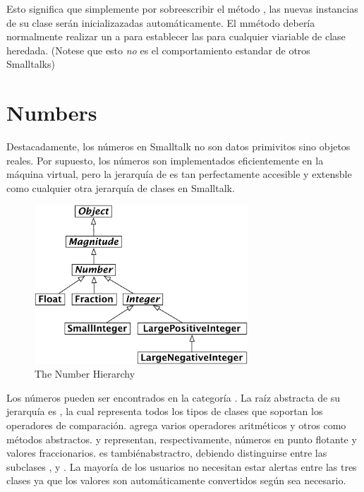 \documentclass[a4paper,10pt,twoside]{book}
\begin{document}
Esto significa que simplemente por sobreescribir el m\'etodo , las nuevas instancias de su clase ser\'an inicializazadas autom\'aticamente. El mm\'etodo  deber\'ia normalmente realizar un  a  para establecer las  para cualquier viariable de clase heredada.
(Notese que esto \emph{no} es el comportamiento estandar de otros Smalltalks)


\section{Numbers}

Destacadamente, los n\'umeros en Smalltalk no son datos primivitos sino objetos reales. Por supuesto, los n\'umeros son implementados eficientemente en la m\'aquina virtual, pero la jerarqu\'ia de  es tan perfectamente accesible y extensble como cualquier otra jerarqu\'ia de clases en Smalltalk.

\begin{figure}[ht]
\centerline {\includegraphics[width=8cm]{NumberHierarchy}}
\caption{The Number Hierarchy }
\end{figure}


Los n\'umeros pueden ser encontrados en la categor\'ia . 
La ra\'iz abstracta de su jerarqu\'ia es , la cual representa todos los tipos de clases que soportan los operadores de comparaci\'on.  agrega varios operadores aritm\'eticos y otros como m\'etodos abstractos.  y  representan, respectivamente, n\'umeros en punto flotante y valores fraccionarios.   es tambi\'enabstractro, debiendo distinguirse entre las subclases ,  y . La mayor\'ia de los usuarios no necesitan estar alertas entre las tres clases  ya que los valores son autom\'aticamente convertidos seg\'un sea necesario.
\end{document}
